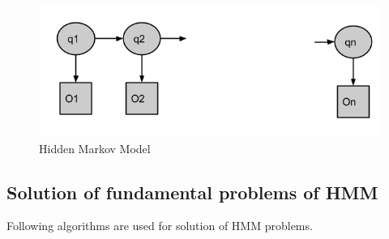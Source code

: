 \documentclass[11pt]{report}
\begin{document}
\begin{figure}[h]
\centering
\includegraphics[scale=.5]{./images/hmm.png}
\caption{Hidden Markov Model}
\end{figure}

\subsection{Solution of fundamental problems of HMM}
Following algorithms are used for solution of HMM problems.
\end{document}
